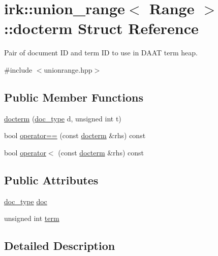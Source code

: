 \hypertarget{structirk_1_1union__range_1_1docterm}{}\section{irk\+:\+:union\+\_\+range$<$ Range $>$\+:\+:docterm Struct Reference}
\label{structirk_1_1union__range_1_1docterm}


Pair of document ID and term ID to use in D\+A\+AT term heap.  




{\ttfamily \#include $<$unionrange.\+hpp$>$}

\subsection*{Public Member Functions}
\begin{DoxyCompactItemize}
\item 
\mbox{\hyperlink{structirk_1_1union__range_1_1docterm_a88cf1e49c5dec4a5508de4215fe084fb}{docterm}} (\mbox{\hyperlink{classirk_1_1union__range_aa502a10f2f5c682199072c0ba11a77a9}{doc\+\_\+type}} d, unsigned int t)
\item 
bool \mbox{\hyperlink{structirk_1_1union__range_1_1docterm_af2091695ddb98d5de0848aa5e717bb4a}{operator==}} (const \mbox{\hyperlink{structirk_1_1union__range_1_1docterm}{docterm}} \&rhs) const
\item 
bool \mbox{\hyperlink{structirk_1_1union__range_1_1docterm_accee80a1089a0fa164de5b7e682ec771}{operator$<$}} (const \mbox{\hyperlink{structirk_1_1union__range_1_1docterm}{docterm}} \&rhs) const
\end{DoxyCompactItemize}
\subsection*{Public Attributes}
\begin{DoxyCompactItemize}
\item 
\mbox{\hyperlink{classirk_1_1union__range_aa502a10f2f5c682199072c0ba11a77a9}{doc\+\_\+type}} \mbox{\hyperlink{structirk_1_1union__range_1_1docterm_a68ede986865c424d7c3bff27b8462fcb}{doc}}
\item 
unsigned int \mbox{\hyperlink{structirk_1_1union__range_1_1docterm_adbeae98a3b7a5bc209008f36f47d469c}{term}}
\end{DoxyCompactItemize}


\subsection{Detailed Description}
